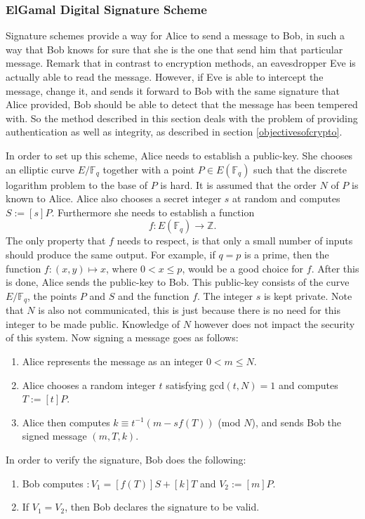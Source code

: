 \documentclass{article}
\numberwithin{equation}{section}
\theoremstyle{definition}
\newcommand{\ZZ}{{\mathbb Z}} %
\newcommand{\FF}[1]{{\mathbb F}_{#1}} %
\begin{document}
\subsubsection{ElGamal Digital Signature Scheme}\label{ElGamalDSS}
Signature schemes provide a way for Alice to send a message to Bob, in such a way that Bob knows for sure that she is the one that send him that particular message. Remark that in contrast to encryption methods, an eavesdropper Eve is actually able to read the message. However, if Eve is able to intercept the message, change it, and sends it forward to Bob with the same signature that Alice provided, Bob should be able to detect that the message has been tempered with. So the method described in this section deals with the problem of providing authentication as well as integrity, as described in section \ref{objectivesofcrypto}. \par
In order to set up this scheme, Alice needs to establish a public-key. She chooses an elliptic curve $E/\FF{q}$ together with a point $P \in E(\FF{q})$ such that the discrete logarithm problem to the base of $P$ is hard. It is assumed that the order $N$ of $P$ is known to Alice. Alice also chooses a secret integer $s$ at random and computes $S:=[s]P$. Furthermore she needs to establish a function $$f:E(\FF{q}) \rightarrow \ZZ.$$ The only property that $f$ needs to respect, is that only a small number of inputs should produce the same output. For example, if $q=p$ is a prime, then the function $f: (x,y) \mapsto x$, where $0<x \leq p$, would be a good choice for $f$. After this is done, Alice sends the public-key to Bob. This public-key consists of the curve $E/\FF{q}$, the points $P$ and $S$ and the function $f$. The integer $s$ is kept private. Note that $N$ is also not communicated, this is just because there is no need for this integer to be made public. Knowledge of $N$ however does not impact the security of this system. Now signing a message goes as follows:
\begin{enumerate}
\item Alice represents the message as an integer $0<m\leq N$.
\item Alice chooses a random integer $t$ satisfying gcd$(t,N)=1$ and computes $T:=[t]P$.
\item Alice then computes $k \equiv t^{-1}(m-sf(T))$ (mod $N$), and sends Bob the signed message $(m,T,k)$.
\end{enumerate}

In order to verify the signature, Bob does the following:
\begin{enumerate}
\item Bob computes $:V_1=[f(T)]S+[k]T$ and $V_2:=[m]P$.
\item If $V_1=V_2$, then Bob declares the signature to be valid.
\end{enumerate}
\end{document}
